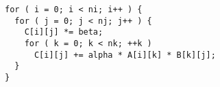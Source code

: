 \begin{lstlisting}[morekeywords={C}, belowskip=0pt]
for ( i = 0; i < ni; i++ ) {
  for ( j = 0; j < nj; j++ ) {
    C[i][j] *= beta;
    for ( k = 0; k < nk; ++k )
      C[i][j] += alpha * A[i][k] * B[k][j];
  }
}
\end{lstlisting}
